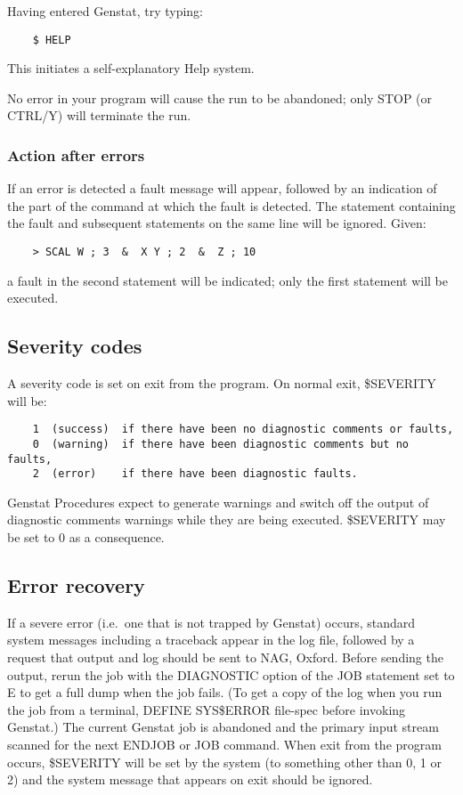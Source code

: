 Having entered Genstat, try typing:
\begin{verbatim}
    $ HELP
\end{verbatim}
This initiates a self-explanatory Help system.

No error in your program will cause the run to be abandoned; only
STOP (or CTRL/Y) will terminate the run.

\subsubsection{Action after errors}

If an error is detected a fault message will appear, followed by an
indication of the part of the command at which the fault is detected.
The statement containing the fault and subsequent statements on the
same line will be ignored.
Given:
\begin{verbatim}
    > SCAL W ; 3  &  X Y ; 2  &  Z ; 10
\end{verbatim}
a fault in the second statement will be indicated; only the first
statement will be executed.

\subsection{Severity codes}

A severity code is set on exit from the program.
On normal exit, \$SEVERITY will be:
\begin{verbatim}
    1  (success)  if there have been no diagnostic comments or faults,
    0  (warning)  if there have been diagnostic comments but no faults,
    2  (error)    if there have been diagnostic faults.
\end{verbatim}
Genstat Procedures expect to generate warnings and switch off the output of
diagnostic comments warnings while they are being executed.
\$SEVERITY may be set to 0 as a consequence.

\subsection{Error recovery}

If a severe error (i.e.\ one that is not trapped by Genstat) occurs,
standard system messages including a traceback appear in the log file,
followed by a request that output and log should be sent to NAG, Oxford.
Before sending the output, rerun the job with the DIAGNOSTIC option of the JOB
statement set to E to get a full dump when the job fails.
(To get a copy of the log when you run the job from a terminal, DEFINE
SYS\$ERROR file-spec before invoking Genstat.)
The current Genstat job is abandoned and the primary input stream
scanned for the next ENDJOB or JOB command.
When exit from the program occurs, \$SEVERITY will be set by the
system (to something other than 0, 1 or 2) and the system message that
appears on exit should be ignored.

